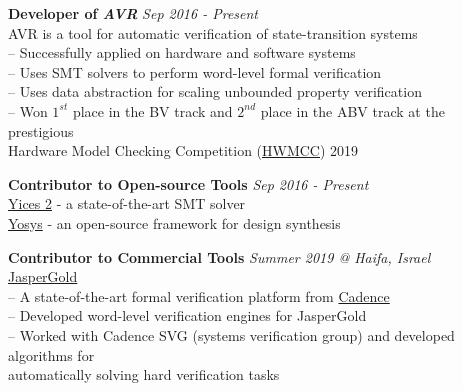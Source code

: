 \documentclass[margin,line,letter]{resume}
\begin{document}
\begin{resume}
    \hspace{-2em} \href{https://github.com/aman-goel/avr}{\faGithub} \hspace{0.3em}
    \textbf{Developer of \textit{AVR}} \hfill \emph{Sep 2016 - Present}\\
    \phantom{xx}\hspace{1ex} AVR is a tool for automatic verification of state-transition systems \\
    \phantom{xx}\hspace{1ex} -- Successfully applied on hardware and software systems \\
    \phantom{xx}\hspace{1ex} -- Uses SMT solvers to perform word-level formal verification \\
    \phantom{xx}\hspace{1ex} -- Uses data abstraction for scaling unbounded property verification \\
    \phantom{xx}\hspace{1ex} -- Won $1^{st}$ place in the BV track and $2^{nd}$ place in the ABV track at the prestigious \\ 
    \phantom{xx}\hspace{3ex} Hardware Model Checking Competition (\href{http://fmv.jku.at/hwmcc19/}{HWMCC}) 2019
    
    \textbf{Contributor to Open-source Tools} \hfill \emph{Sep 2016 - Present}\\ 
    \phantom{xx}\hspace{1ex} \href{https://github.com/SRI-CSL/yices2}{Yices 2} - a state-of-the-art SMT solver \\
    \phantom{xx}\hspace{1ex} \href{https://github.com/YosysHQ/yosys}{Yosys} - an open-source framework for design synthesis

    \textbf{Contributor to Commercial Tools} \hfill \emph{Summer 2019 @ Haifa, Israel}\\ 
    \phantom{xx}\hspace{1ex} \href{https://www.cadence.com/content/cadence-www/global/en_US/home/tools/system-design-and-verification/formal-and-static-verification/jasper-gold-verification-platform.html}{JasperGold} \\
    \phantom{xx}\hspace{1ex} -- A state-of-the-art formal verification platform from \href{https://www.cadence.com/}{Cadence} \\
    \phantom{xx}\hspace{1ex} -- Developed word-level verification engines for JasperGold \\
    \phantom{xx}\hspace{1ex} -- Worked with Cadence SVG (systems verification group) and developed algorithms for \\
    \phantom{xx}\hspace{3ex} automatically solving hard verification tasks


\end{resume}
\end{document}
